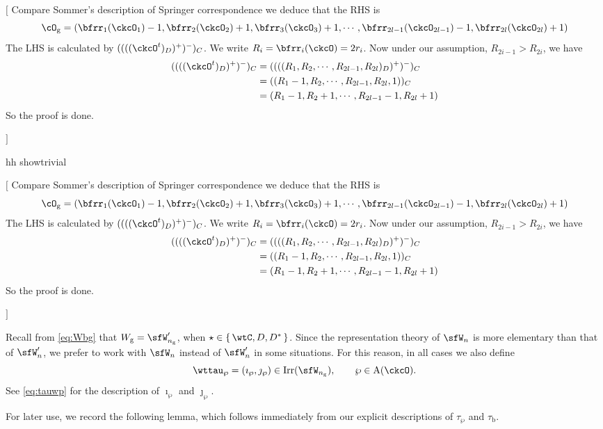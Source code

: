 \documentclass[12pt,a4paper]{amsart}
\newcommand{\trivial}[2][]{\if\relax\detokenize{#1}\relax
  {%
      \color{orange} \vspace{0em} $[$  #2 $]$
      \color{black}
  }
  \else
\ifx#1h
\ifcsname showtrivial\endcsname
{%
    \color{orange} \vspace{0em}  $[$ #2 $]$
    \color{black}
}
\fi
\else {\red Wrong argument!} \fi
\fi
}
\numberwithin{equation}{section}
\theoremstyle{remark}
\newtheorem{remark}[thm]{Remark}
\def\Irr{\mathrm{Irr}}
\def\dBV{d_{\mathrm{BV}}}
\def\Wg{W_{\mathrm g}}
\def\cuprow{{\stackrel{r}{\sqcup}}}
\def\cupcol{{\stackrel{c}{\sqcup}}}
\def\cuprow{{\,\stackrel{r}{\sqcup}\,}}
\def\cupcol{{\,\stackrel{c}{\sqcup}\,}}
\begin{document}
    \trivial[h]{ Compare Sommer's description of Springer correspondence we
      deduce that the RHS is
      \[
        \cO_{\mathrm g} = (\bfrr_{1}(\ckcO_{1})-1,\bfrr_{2}(\ckcO_{2})+1,\bfrr_{3}(\ckcO_{3})+1, \cdots, \bfrr_{2l-1}(\ckcO_{2l-1})-1,\bfrr_{2l}(\ckcO_{2l})+1)
      \]
      The LHS is calculated by $((((\ckcO^{t})_{D})^{+})^{-})_{C}$. We write
      $R_{i}=\bfrr_{i}(\ckcO)=2r_{i}$. Now under our assumption,
      $R_{2i-1}>R_{2i}$, we have
      \[
        \begin{split}
          ((((\ckcO^{t})_{D})^{+})^{-})_{C} &=
          ((((R_{1},R_{2}, \cdots, R_{2l-1},R_{2l})_{D})^{+})^{-})_{C}\\
          &=((R_{1}-1,R_{2}, \cdots, R_{2l-1},R_{2l},1))_{C}\\
          &=(R_{1}-1,R_{2}+1, \cdots, R_{2l-1}-1,R_{2l}+1)\\
        \end{split}
      \]
      So the proof is done.

    }



%

Recall from \eqref{eq:Wbg} that $\Wg =\sfW'_{n_{\mathrm g}}$, when $\star \in \set{\wtC,D,D^{*}}$. Since the representation theory of $\sfW_{n}$ is more elementary than that of
$\sfW'_{n}$, we prefer to work with $\sfW_n$ instead of $\sfW_n'$ in some situations. For this reason, in all cases we also define
\begin{equation}\label{eq:ttauwp}
\wttau_{\wp} = (\imath_{\wp},\jmath_{\wp})\in \Irr(\sfW_{n_\mathrm g}), \qquad \wp\in {\mathrm A}(\ckcO).
\end{equation}
See \eqref{eq:tauwp} for the description of $\imath_{\wp}$ and $\jmath_{\wp}$. 

For later use, we record the following lemma, which follows immediately from our explicit descriptions of $\tau_{\wp}$ and $\tau_{\mathrm b}$.
\end{document}
